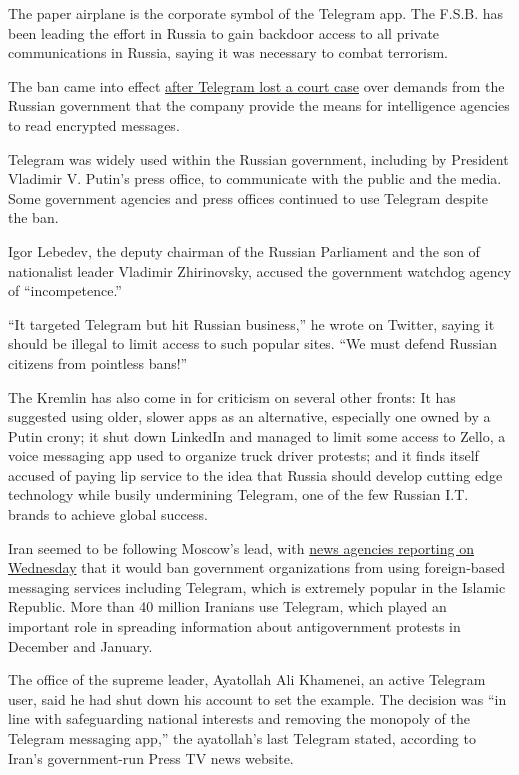The paper airplane is the corporate symbol of the Telegram app. The
F.S.B. has been leading the effort in Russia to gain backdoor access to
all private communications in Russia, saying it was necessary to combat
terrorism.

The ban came into effect
\href{https://www.nytimes.com/2018/04/13/world/europe/russia-telegram-encryption.html}{after
Telegram lost a court case} over demands from the Russian government
that the company provide the means for intelligence agencies to read
encrypted messages.

Telegram was widely used within the Russian government, including by
President Vladimir V. Putin's press office, to communicate with the
public and the media. Some government agencies and press offices
continued to use Telegram despite the ban.

Igor Lebedev, the deputy chairman of the Russian Parliament and the son
of nationalist leader Vladimir Zhirinovsky, accused the government
watchdog agency of ``incompetence.''

``It targeted Telegram but hit Russian business,'' he wrote on Twitter,
saying it should be illegal to limit access to such popular sites. ``We
must defend Russian citizens from pointless bans!''

The Kremlin has also come in for criticism on several other fronts: It
has suggested using older, slower apps as an alternative, especially one
owned by a Putin crony; it shut down LinkedIn and managed to limit some
access to Zello, a voice messaging app used to organize truck driver
protests; and it finds itself accused of paying lip service to the idea
that Russia should develop cutting edge technology while busily
undermining Telegram, one of the few Russian I.T. brands to achieve
global success.

Iran seemed to be following Moscow's lead, with
\href{http://www.presstv.com/Detail/2018/04/18/558899/Iran-Leader-Telegram}{news
agencies reporting on Wednesday} that it would ban government
organizations from using foreign-based messaging services including
Telegram, which is extremely popular in the Islamic Republic. More than
40 million Iranians use Telegram, which played an important role in
spreading information about antigovernment protests in December and
January.

The office of the supreme leader, Ayatollah Ali Khamenei, an active
Telegram user, said he had shut down his account to set the example. The
decision was ``in line with safeguarding national interests and removing
the monopoly of the Telegram messaging app,'' the ayatollah's last
Telegram stated, according to Iran's government-run Press TV news
website.


